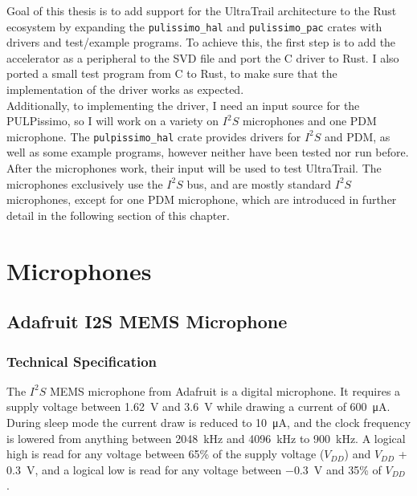 

Goal of this thesis is to add support for the UltraTrail architecture to the Rust ecosystem by expanding the
\lstinline{pulissimo_hal} and \lstinline{pulissimo_pac} crates with drivers and test/example programs.
To achieve this, the first step is to add the accelerator as a peripheral to the SVD file and port the C driver to Rust.
I also ported a small test program from C to Rust, to make sure that the implementation of the driver works as expected.
\\
Additionally, to implementing the driver, I need an input source for the PULPissimo, so I will work on a variety on $I^2S$ microphones and one PDM microphone.
The \lstinline{pulpissimo_hal} crate provides drivers for $I^2S$ and PDM, as well as some example programs, however neither have been tested nor run before.
After the microphones work, their input will be used to test UltraTrail.
The microphones exclusively use the $I^2S$ bus, and are mostly standard $I^2S$ microphones, except for one PDM microphone,
which are introduced in further detail in the following section of this chapter.

\section{Microphones}

\subsection{Adafruit I2S MEMS Microphone}

\subsubsection{Technical Specification}

The $I^2S$ MEMS microphone from Adafruit \cite{i2s_mic} is a digital microphone.
It requires a supply voltage between \SI{1.62}{\volt} and \SI{3.6}{\volt} while drawing a current of \SI{600}{\micro\ampere}.
During sleep mode the current draw is reduced to \SI{10}{\micro\ampere}, and the clock frequency is lowered from anything between
\SI{2048}{\kilo\hertz} and \SI{4096}{\kilo\hertz} to \SI{900}{\kilo\hertz}.
A logical high is read for any voltage between 65\% of the supply voltage ($V_{DD}$) and $V_{DD}$ + \SI{0.3}{\volt},
and a logical low is read for any voltage between \SI{-0.3}{\volt} and 35\% of $V_{DD}$ \cite{i2s_mic_datasheet}.

